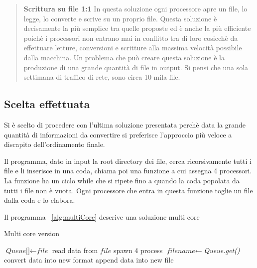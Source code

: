 \documentclass[../main.tex]{subfiles}
\begin{document}
\begin{verse}
\textbf{Scrittura su file 1:1}
In questa soluzione ogni processore apre un file, lo legge, lo converte e scrive su un proprio file.
Questa soluzione è decisamente la più semplice tra quelle proposte ed è anche la più efficiente poichè i processori non entrano mai in conflitto tra di loro cosicchè da effettuare letture, conversioni e scritture alla massima velocità possibile dalla macchina.
Un problema che può creare questa soluzione è la produzione di una grande quantità di file in output. Si pensi che una sola settimana di traffico di rete, sono circa 10 mila file.
\end{verse}

\subsection{Scelta effettuata}

Si è scelto di procedere con l'ultima soluzione presentata perchè data la grande quantità di informazioni da convertire si preferisce l'approccio più veloce a discapito dell'ordinamento finale.

Il programma, dato in input la root directory dei file, cerca ricorsivamente tutti i file e li inserisce in una coda, chiama poi una funzione a cui assegna 4 processori. La funzione ha un ciclo while che si ripete fino a quando la coda popolata da tutti i file non è vuota. Ogni processore che entra in questa funzione toglie un file dalla coda e lo elabora.

Il programma ~\ref{alg:multiCore} descrive una soluzione multi core
\begin{algorithm}
\caption{Multi core version}
				\label{alg:multiCore}
\begin{algorithmic}[1]
\State $\textit{Queue[]} \gets \textit{file}$
\State read data from $\textit{file}$
\State spawn 4 process
\State $\textit{filename} \gets $\textit{Queue.get()}
\State convert data into new format
\State append data into new file
\EndWhile
\EndFor
\EndProcedure
\end{algorithmic}
\end{algorithm}
\end{document}
